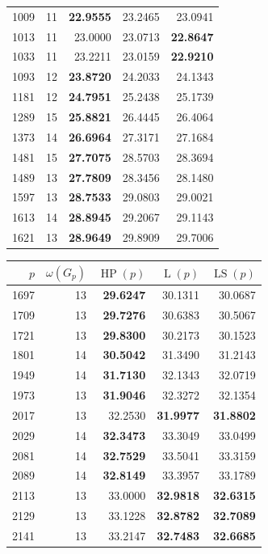 \documentclass[]{spie}  %
\begin{document}
\begin{table}
{\begin{tabular}{rrrrr}
1009 & 11 & \textbf{22.9555} & 23.2465 & 23.0941 \\
1013 & 11 & 23.0000 & 23.0713 & \textbf{22.8647} \\
1033 & 11 & 23.2211 & 23.0159 & \textbf{22.9210} \\
1093 & 12 & \textbf{23.8720} & 24.2033 & 24.1343 \\
1181 & 12 & \textbf{24.7951} & 25.2438 & 25.1739 \\
1289 & 15 & \textbf{25.8821} & 26.4445 & 26.4064 \\
1373 & 14 & \textbf{26.6964} & 27.3171 & 27.1684 \\
1481 & 15 & \textbf{27.7075} & 28.5703 & 28.3694 \\
1489 & 13 & \textbf{27.7809} & 28.3456 & 28.1480 \\
1597 & 13 & \textbf{28.7533} & 29.0803 & 29.0021 \\
1613 & 14 & \textbf{28.8945} & 29.2067 & 29.1143 \\
1621 & 13 & \textbf{28.9649} & 29.8909 & 29.7006 \\
\end{tabular}
\hspace{1em}
\begin{tabular}{rrrrr}
\hline
 $p$ & $\omega(G_p)$ & $\operatorname{HP}(p)$ & $\operatorname{L}(p)$ & $\operatorname{LS}(p)$\\
 \hline
1697 & 13 & \textbf{29.6247} & 30.1311 & 30.0687 \\
1709 & 13 & \textbf{29.7276} & 30.6383 & 30.5067 \\
1721 & 13 & \textbf{29.8300} & 30.2173 & 30.1523 \\
1801 & 14 & \textbf{30.5042} & 31.3490 & 31.2143 \\
1949 & 14 & \textbf{31.7130} & 32.1343 & 32.0719 \\
1973 & 13 & \textbf{31.9046} & 32.3272 & 32.1354 \\
2017 & 13 & 32.2530 & \textbf{31.9977} & \textbf{31.8802} \\
2029 & 14 & \textbf{32.3473} & 33.3049 & 33.0499 \\
2081 & 14 & \textbf{32.7529} & 33.5041 & 33.3159 \\
2089 & 14 & \textbf{32.8149} & 33.3957 & 33.1789 \\
2113 & 13 & 33.0000 & \textbf{32.9818} & \textbf{32.6315} \\
2129 & 13 & 33.1228 & \textbf{32.8782} & \textbf{32.7089} \\
2141 & 13 & 33.2147 & \textbf{32.7483} & \textbf{32.6685} \\

\end{tabular}}
\end{table}
\end{document}

